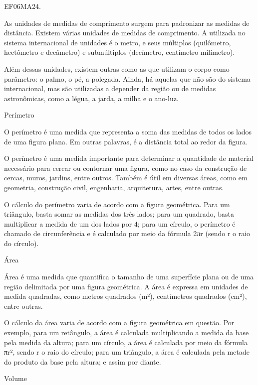 
\begin{itemize}
EF06MA24.
\end{itemize}

As unidades de medidas de comprimento surgem para padronizar as medidas
de distância. Existem várias unidades de medidas de comprimento. A
utilizada no sistema internacional de unidades é o metro, e seus
múltiplos (quilômetro, hectômetro e decâmetro) e submúltiplos
(decímetro, centímetro milímetro).

Além dessas unidades, existem outras como as que utilizam o corpo como
parâmetro: o palmo, o pé, a polegada. Ainda, há aquelas que não são do
sistema internacional, mas são utilizadas a depender da região ou de
medidas astronômicas, como a légua, a jarda, a milha e o ano-luz.

Perímetro

O perímetro é uma medida que representa a soma das medidas de todos os
lados de uma figura plana. Em outras palavras, é a distância total ao
redor da figura.

O perímetro é uma medida importante para determinar a quantidade de
material necessário para cercar ou contornar uma figura, como no caso da
construção de cercas, muros, jardins, entre outros. Também é útil em
diversas áreas, como em geometria, construção civil, engenharia,
arquitetura, artes, entre outras.

O cálculo do perímetro varia de acordo com a figura geométrica. Para um
triângulo, basta somar as medidas dos três lados; para um quadrado,
basta multiplicar a medida de um dos lados por 4; para um círculo, o
perímetro é chamado de circunferência e é calculado por meio da fórmula
2πr (sendo r o raio do círculo).

Área

Área é uma medida que quantifica o tamanho de uma superfície plana ou de
uma região delimitada por uma figura geométrica. A área é expressa em
unidades de medida quadradas, como metros quadrados (m²), centímetros
quadrados (cm²), entre outras.

O cálculo da área varia de acordo com a figura geométrica em questão.
Por exemplo, para um retângulo, a área é calculada multiplicando a
medida da base pela medida da altura; para um círculo, a área é
calculada por meio da fórmula πr², sendo r o raio do círculo; para um
triângulo, a área é calculada pela metade do produto da base pela
altura; e assim por diante.

Volume

